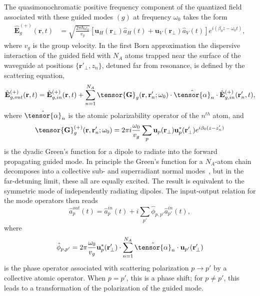 \documentclass[preprint,aps,pra,onecolumn,superscriptaddress]{revtex4-1} %
\def\br{\mathbf{r}}
\newcommand{\mbf}[1]{\mathbf{#1}}
\begin{document}
The quasimonochromatic positive frequency component of the quantized field associated with these guided modes $(g)$ at frequency $\omega_0$ takes the form
\begin{align}\label{eq:Ebp}
\hat{\mathbf{E}}^{(+)}_g(\mbf{r}, t) &= \sqrt{ \frac{2 \pi \hbar \omega_0}{ v_g} } \left[\mathbf{u}_H(\mbf{r}\!_\perp)  \hat{a}_H(t) + \mathbf{u}_V(\mbf{r}\!_\perp) \hat{a}_V(t)\right]  e^{i (\beta_0 z- \omega_0 t)},
\end{align}
where $v_g$ is the group velocity.  In the first Born approximation the dispersive interaction of the guided field with $N_A$ atoms trapped near the surface of the waveguide at positions $\{\mbf{r}'_\perp, z_n\}$, detuned far from resonance,  is defined by the scattering equation,
\begin{equation}
\hat{\mathbf{E}}^{(+)}_{g,out}(\mbf{r}, t)=\hat{\mathbf{E}}^{(+)}_{g,in}(\mbf{r}, t)+\sum_{n=1}^{N_A} \tensor{\mbf{G}}_{g} (\mbf{r}, \mbf{r}'_n;\omega_0) \cdot \hat{\tensor{\alpha}}_n \cdot \hat{\mathbf{E}}^{(+)}_{g,in}(\mbf{r}'_n, t),
\end{equation}
where $\hat{\tensor{\alpha}}_n$ is the atomic polarizability operator of the $n^{th}$ atom, and 
\begin{equation}
		\tensor{\mathbf{G}}^{(+)}_g(\br,\br'_n; \omega_0) =  2\pi i \frac{\omega_0}{v_g } \sum_{p} \mathbf{u}_{p} (\br_\perp)\mathbf{u}^*_{p} 
(\br_{\perp}^\prime) e^{i \beta_0(z-z'_n)}  \label{Eq::GreensGuided}
\end{equation}
is the dyadic Green's function for a dipole to radiate into the forward propagating guided mode.  In principle the Green's function for a $N_A$-atom chain decomposes into a collective sub- and superradiant normal modes~\cite{Asenjo-Garcia2017Atom,Asenjo-Garcia2017Exponential}, but in the far-detuning limit, these all are equally excited.  The result is equivalent to the symmetric mode of independently radiating dipoles.  The input-output relation for the mode operators then reads
\begin{equation}
\hat{a}^{out}_p(t) = \hat{a}^{in}_p(t)  +i \sum_{p'} \hat{\phi}_{p,p'} \hat{a}^{in}_{p'}(t) ,
\end{equation}
where 
\begin{equation}
\hat{\phi}_{p,p'} = 2\pi \frac{\omega_0}{v_g} \mbf{u}^*_p (\mbf{r}'_\perp) \cdot \sum_{n=1}^{N_A} \hat{\tensor{\alpha}}_n \cdot \mbf{u}_{p'} (\mbf{r}'_\perp)
\end{equation}
is the phase operator associated with scattering polarization $p \rightarrow p'$ by a collective atomic operator.  When $p=p'$, this is a phase shift; for $p \neq p'$, this leads to a transformation of the polarization of the guided mode.
\end{document}
